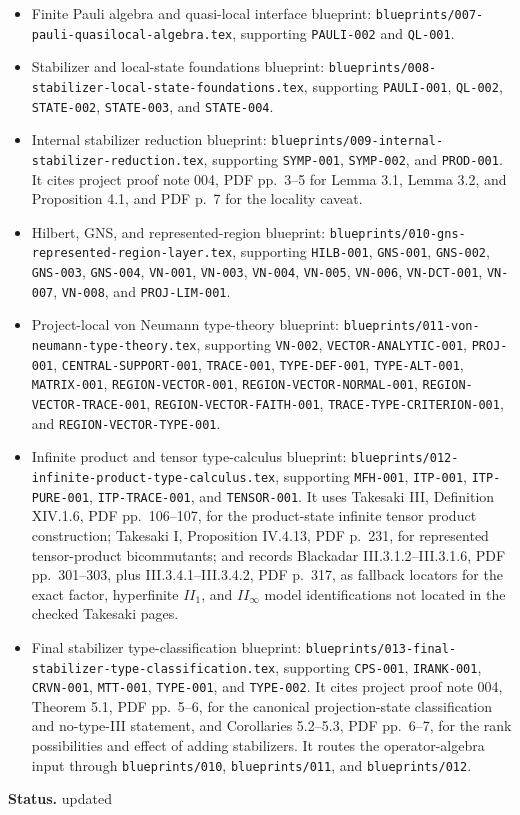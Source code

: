 \documentclass{article}
\newcommand{\status}[1]{\par\noindent\textbf{Status.} #1}
\begin{document}
\begin{itemize}
\texttt{blueprints/006-full-type-classification-dependency-plan.tex}.
\item Finite Pauli algebra and quasi-local interface blueprint:
\texttt{blueprints/007-pauli-quasilocal-algebra.tex}, supporting
\texttt{PAULI-002} and \texttt{QL-001}.
\item Stabilizer and local-state foundations blueprint:
\texttt{blueprints/008-stabilizer-local-state-foundations.tex}, supporting
\texttt{PAULI-001}, \texttt{QL-002}, \texttt{STATE-002},
\texttt{STATE-003}, and \texttt{STATE-004}.
\item Internal stabilizer reduction blueprint:
\texttt{blueprints/009-internal-stabilizer-reduction.tex}, supporting
\texttt{SYMP-001}, \texttt{SYMP-002}, and \texttt{PROD-001}.  It cites project
proof note 004, PDF pp.~3--5 for Lemma 3.1, Lemma 3.2, and Proposition 4.1,
and PDF p.~7 for the locality caveat.
\item Hilbert, GNS, and represented-region blueprint:
\texttt{blueprints/010-gns-represented-region-layer.tex}, supporting
\texttt{HILB-001}, \texttt{GNS-001}, \texttt{GNS-002}, \texttt{GNS-003},
\texttt{GNS-004}, \texttt{VN-001}, \texttt{VN-003}, \texttt{VN-004},
\texttt{VN-005}, \texttt{VN-006}, \texttt{VN-DCT-001}, \texttt{VN-007},
\texttt{VN-008}, and \texttt{PROJ-LIM-001}.
\item Project-local von Neumann type-theory blueprint:
\texttt{blueprints/011-von-neumann-type-theory.tex}, supporting
\texttt{VN-002}, \texttt{VECTOR-ANALYTIC-001}, \texttt{PROJ-001},
\texttt{CENTRAL-SUPPORT-001}, \texttt{TRACE-001},
\texttt{TYPE-DEF-001}, \texttt{TYPE-ALT-001}, \texttt{MATRIX-001},
\texttt{REGION-VECTOR-001}, \texttt{REGION-VECTOR-NORMAL-001},
\texttt{REGION-VECTOR-TRACE-001}, \texttt{REGION-VECTOR-FAITH-001},
\texttt{TRACE-TYPE-CRITERION-001}, and \texttt{REGION-VECTOR-TYPE-001}.
\item Infinite product and tensor type-calculus blueprint:
\texttt{blueprints/012-infinite-product-type-calculus.tex}, supporting
\texttt{MFH-001}, \texttt{ITP-001}, \texttt{ITP-PURE-001},
\texttt{ITP-TRACE-001}, and \texttt{TENSOR-001}.  It uses Takesaki III,
Definition XIV.1.6, PDF
pp.~106--107, for the product-state infinite tensor product construction;
Takesaki I, Proposition IV.4.13, PDF p.~231, for represented tensor-product
bicommutants; and records Blackadar III.3.1.2--III.3.1.6, PDF pp.~301--303,
plus III.3.4.1--III.3.4.2, PDF p.~317, as fallback locators for the exact
factor, hyperfinite \(II_1\), and \(II_\infty\) model identifications not
located in the checked Takesaki pages.
\item Final stabilizer type-classification blueprint:
\texttt{blueprints/013-final-stabilizer-type-classification.tex}, supporting
\texttt{CPS-001}, \texttt{IRANK-001}, \texttt{CRVN-001}, \texttt{MTT-001},
\texttt{TYPE-001}, and \texttt{TYPE-002}.  It cites project proof note 004,
Theorem 5.1, PDF pp.~5--6, for the canonical projection-state classification
and no-type-III statement, and Corollaries 5.2--5.3, PDF pp.~6--7, for the rank
possibilities and effect of adding stabilizers.  It routes the
operator-algebra input through \texttt{blueprints/010}, \texttt{blueprints/011},
and \texttt{blueprints/012}.
\end{itemize}

\status{updated}
\end{document}
